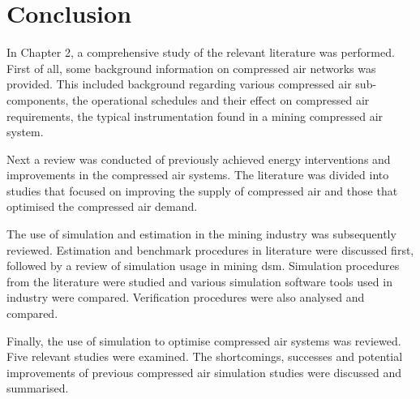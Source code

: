 \section{Conclusion}
In Chapter 2, a comprehensive study of the relevant literature was performed. First of all, some background information on compressed air networks was provided. This included background regarding various compressed air sub-components, the operational schedules and their effect on compressed air requirements, the typical instrumentation found in a mining compressed air system.
\par
Next a review was conducted of previously achieved energy interventions and improvements in the compressed air systems. The literature was divided into studies that focused on improving the supply of compressed air and those that optimised the compressed air demand.
\par
The use of simulation and estimation in the mining industry was subsequently reviewed. Estimation and benchmark procedures in literature were discussed first, followed by a review of simulation usage in mining \gls{dsm}. Simulation procedures from the literature were studied and various simulation software tools used in industry were compared. Verification procedures were also analysed and compared.
\par 
	Finally, the use of simulation to optimise compressed air systems was reviewed.  Five relevant studies were examined. The shortcomings, successes and potential improvements of previous compressed air simulation studies were discussed and summarised.